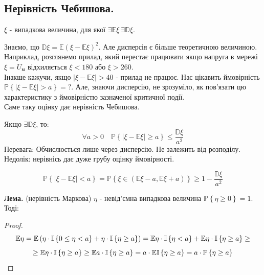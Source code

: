 \subsection{Нерівність Чебишова.}
$\xi$ - випадкова величина, для якої $\exists \mathbb{E}\xi \  \exists \mathbb{D} \xi$.\\
\par
Знаємо, що $
\mathbb{D} \xi = \mathbb{E} (\xi - \mathbb{E} \xi)^2
$. Але дисперсія є більше теоретичною величиною. Наприклад, розглянемо прилад, який перестає працювати якщо напруга в мережі $\xi = U_{\text{м}} $ відхиляється $\xi < 180 $ або $ \xi > 260$.\\
Інакше кажучи, якщо $ \left| \xi - \mathbb{E}\xi \right| > 40$ - прилад не працює. Нас цікавить ймовірність $\mathbb{P} \left\lbrace \left| \xi - \mathbb{E} \xi \right| > a \right\rbrace \!\!= ?$. Але, знаючи дисперсію, не зрозуміло, як пов'язати цю характеристику з ймовірністю зазначеної критичної події. \\Саме таку оцінку дає нерівність Чебишова.
\begin{boxteo}
Якщо $\exists \mathbb{D} \xi$, то:
$$
\forall a > 0 \quad \mathbb{P} \left\lbrace \left| \xi - \mathbb{E} \xi \right| \geq a \right\rbrace \leq \frac{\mathbb{D} \xi}{a^2}
$$
Перевага: Обчислюється лише через дисперсію. Не залежить від розподілу.\\
Недолік: нерівнісь дає дуже грубу оцінку ймовірності.
\end{boxteo}
\begin{consequence}
    $$\mathbb{P} \left\lbrace \left| \xi - \mathbb{E} \xi \right| < a \right\rbrace = \mathbb{P} \left\lbrace  \xi \in \left(  \mathbb{E}  \xi - a, \mathbb{E}\xi + a \right) \right\rbrace \geq  1 - \frac{ \mathbb{D} \xi}{a^2 } $$
\end{consequence}
\textbf{Лема. }(нерівність Маркова)
$\eta$ - невід'ємна випадкова величина $\mathbb{P} \left\lbrace \eta \geq 0 \right\rbrace = 1$.
\\Тоді:\ 
\begin{proof}
$$
\mathbb{E} \eta = \mathbb{E} \left( \eta \cdot \mathbb{I}{} \left\lbrace 0 \leq \eta < a \right\rbrace
+ \eta\cdot \mathbb{I}{} \left\lbrace  \eta \geq a\right\rbrace
 \right) = \mathbb{E} \eta \cdot  \mathbb{I} \left\lbrace \eta < a \right\rbrace + \mathbb{E} \eta\cdot \mathbb{I} \left\lbrace   \eta \geq  a \right\rbrace \geq
$$
$$
\geq  \mathbb{E} \eta \cdot \mathbb{I} \left\lbrace \eta \geq a  \right\rbrace \geq  \mathbb{E} a \cdot \mathbb{I} \left\lbrace  \eta \geq a \right\rbrace = a \cdot \mathbb{E} \mathbb{I} \left\lbrace \eta \geq a  \right\rbrace = a \cdot \mathbb{P} \left\lbrace \eta \geq a \right\rbrace
$$

\end{proof}

